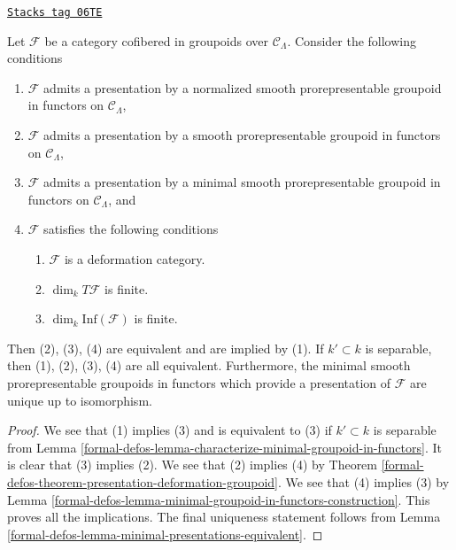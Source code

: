 \begin{theorem}
\label{formal-defos-theorem-minimal-smooth-prorepresentable-presentations}
\href{https://stacks.math.columbia.edu/tag/06TE}{\texttt{Stacks tag 06TE}}

Let $\mathcal{F}$ be a category cofibered in groupoids over
$\mathcal{C}_\Lambda$. Consider the following conditions
\begin{enumerate}
\item $\mathcal{F}$ admits a presentation by a normalized
smooth prorepresentable groupoid in functors on $\mathcal{C}_\Lambda$,
\item $\mathcal{F}$ admits a presentation by a
smooth prorepresentable groupoid in functors on $\mathcal{C}_\Lambda$,
\item $\mathcal{F}$ admits a presentation by a minimal
smooth prorepresentable groupoid in functors on $\mathcal{C}_\Lambda$, and
\item $\mathcal{F}$ satisfies the following conditions
\begin{enumerate}
\item $\mathcal{F}$ is a deformation category.
\item $\dim_k T\mathcal{F}$ is finite.
\item $\dim_k \text{Inf}(\mathcal{F})$ is finite.
\end{enumerate}
\end{enumerate}
Then (2), (3), (4) are equivalent and are implied by (1).
If $k' \subset k$ is separable, then (1), (2), (3), (4) are all equivalent.
Furthermore, the minimal smooth prorepresentable groupoids in functors
which provide a presentation of $\mathcal{F}$ are unique up to isomorphism.
\end{theorem}

\begin{proof}
We see that (1) implies (3) and is equivalent to (3) if
$k' \subset k$ is separable from
Lemma \ref{formal-defos-lemma-characterize-minimal-groupoid-in-functors}.
It is clear that (3) implies (2). We see that (2) implies (4) by
Theorem \ref{formal-defos-theorem-presentation-deformation-groupoid}.
We see that (4) implies (3) by
Lemma \ref{formal-defos-lemma-minimal-groupoid-in-functors-construction}.
This proves all the implications.
The final uniqueness statement follows from
Lemma \ref{formal-defos-lemma-minimal-presentations-equivalent}.
\end{proof}

